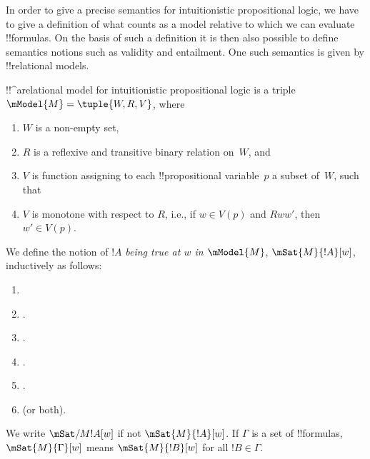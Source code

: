 \documentclass[../../../include/open-logic-section]{subfiles}
\begin{document}


In order to give a precise semantics for intuitionistic propositional
logic, we have to give a definition of what counts as a model relative
to which we can evaluate !!{formula}s. On the basis of such a
definition it is then also possible to define semantics notions such
as validity and entailment. One such semantics is given by
!!{relational model}s.

\begin{defn}
  !!^a{relational model} for intuitionistic propositional logic is a
  triple $\mModel{M} = \tuple{W, R, V}$, where
  \begin{enumerate}
  \item $W$ is a non-empty set,
  \item $R$ is a reflexive and transitive binary relation on~$W$, and
  \item $V$ is function assigning to each !!{propositional
    variable}~$p$ a subset of~$W$, such that
  \item $V$ is monotone with respect to $R$, i.e., if $w
    \in V(p)$ and $Rww'$, then $w' \in V(p)$.
  \end{enumerate}
\end{defn}

\begin{defn}
  We define the notion of $!A$ \emph{being true at $w$ in
    $\mModel{M}$}, $\mSat{M}{!A}[w]$, inductively as follows:
  \begin{enumerate}
  \item {}
  \item {}.
  \item {}.
  \item {}.
  \item {}.
  \item {} (or both).
  \end{enumerate}
  We write $\mSat/{M}{!A}[w]$ if not $\mSat{M}{!A}[w]$. If $\Gamma$ is
  a set of !!{formula}s, $\mSat{M}{\Gamma}[w]$ means $\mSat{M}{!B}[w]$
  for all $!B \in \Gamma$.
\end{defn}
\end{document}
